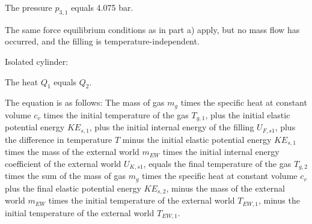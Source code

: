 The pressure \( p_{3,1} \) equals 4.075 bar.

The same force equilibrium conditions as in part a) apply, but no mass flow has occurred, and the filling is temperature-independent.

Isolated cylinder:

The heat \( Q_1 \) equals \( Q_2 \).

The equation is as follows:
The mass of gas \( m_g \) times the specific heat at constant volume \( c_v \) times the initial temperature of the gas \( T_{g,1} \), plus the initial elastic potential energy \( KE_{s,1} \), plus the initial internal energy of the filling \( U_{F,s1} \), plus the difference in temperature \( T \) minus the initial elastic potential energy \( KE_{s,1} \) times the mass of the external world \( m_{EW} \) times the initial internal energy coefficient of the external world \( U_{K,s1} \), equals the final temperature of the gas \( T_{g,2} \) times the sum of the mass of gas \( m_g \) times the specific heat at constant volume \( c_v \) plus the final elastic potential energy \( KE_{s,2} \), minus the mass of the external world \( m_{EW} \) times the initial temperature of the external world \( T_{EW,1} \), minus the initial temperature of the external world \( T_{EW,1} \).